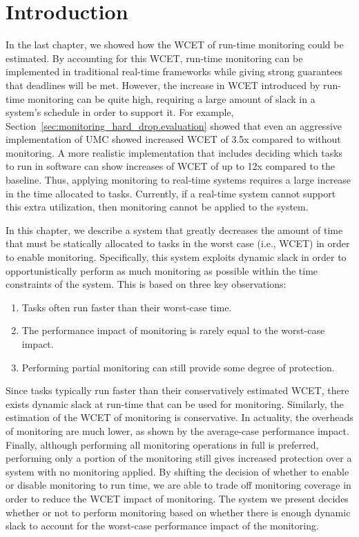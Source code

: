 \section{Introduction}
\label{sec:monitoring_hard_drop.introduction}

In the last chapter, we showed how the WCET of run-time monitoring could be
estimated. By accounting for this WCET, run-time monitoring can be
implemented in traditional real-time frameworks while giving strong guarantees
that deadlines will be met. However, the increase in WCET introduced by
run-time monitoring can be quite high, requiring a large amount of slack in a
system's schedule in order to support it. For example,
Section~\ref{sec:monitoring_hard_drop.evaluation} showed that even an
aggressive implementation of UMC showed increased WCET of 3.5x compared to
without monitoring. A more realistic implementation that includes deciding
which tasks to run in software can show increases of WCET of up to 12x compared
to the baseline.  Thus, applying monitoring to real-time systems requires a
large increase in the time allocated to tasks.  Currently, if a real-time
system cannot support this extra utilization, then monitoring cannot be applied
to the system.  

In this chapter, we describe a system that greatly decreases the amount of time
that must be statically allocated to tasks in the worst case (i.e., WCET) in
order to enable monitoring. Specifically, this system exploits dynamic slack in
order to opportunistically perform as much monitoring as possible within the
time constraints of the system. This is based on three key observations:
\begin{enumerate}
  \item Tasks often run faster than their worst-case time.
  \item The performance impact of monitoring is rarely equal to the worst-case impact.
  \item Performing partial monitoring can still provide some degree of protection.
\end{enumerate}
Since tasks typically run faster than their conservatively estimated WCET,
there exists dynamic slack at run-time that can be used for monitoring.
Similarly, the estimation of the WCET of monitoring is conservative. In
actuality, the overheads of monitoring are much lower, as shown by the
average-case performance impact. Finally, although performing all monitoring
operations in full is preferred, performing only a portion of the monitoring
still gives increased protection over a system with no monitoring applied.
By shifting the decision of whether to enable or disable monitoring to
run time, we are able to trade off monitoring coverage in order to reduce the
WCET impact of monitoring. The system we present decides whether or not to
perform monitoring based on whether there is enough dynamic slack to account
for the worst-case performance impact of the monitoring.

